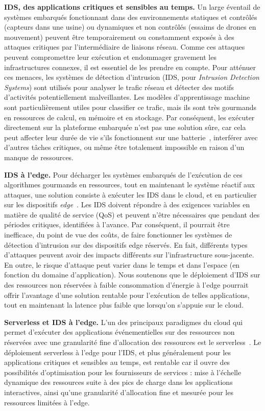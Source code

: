 \textbf{IDS, des applications critiques et sensibles au temps.} Un large éventail de systèmes embarqués fonctionnant dans des environnements statiques et contrôlés (capteurs dans une usine) ou dynamiques et non contrôlés (essaims de drones en mouvement) peuvent être temporairement ou constamment exposés à des attaques critiques par l'intermédiaire de liaisons réseau. Comme ces attaques peuvent compromettre leur exécution et endommager gravement les infrastructures connexes, il est essentiel de les prendre en compte. Pour atténuer ces menaces, les systèmes de détection d'intrusion (IDS, pour \textit{Intrusion Detection Systems}) sont utilisés pour analyser le trafic réseau et détecter des motifs d'activités potentiellement malveillantes. Les modèles d'apprentissage machine sont particulièrement utiles pour classifier ce trafic, mais ils sont très gourmands en ressources de calcul, en mémoire et en stockage. Par conséquent, les exécuter directement sur la plateforme embarquée n'est pas une solution sûre, car cela peut affecter leur durée de vie s'ils fonctionnent sur une batterie~\cite{slimani:hal-04159551}, interférer avec d'autres tâches critiques, ou même être totalement impossible en raison d'un manque de ressources.

\textbf{IDS à l'edge.} Pour décharger les systèmes embarqués de l'exécution de ces algorithmes gourmands en ressources, tout en maintenant le système réactif aux attaques, une solution consiste à exécuter les IDS dans le cloud, et en particulier sur les dispositifs \textit{edge}~\cite{eskandari2020}. Les IDS doivent répondre à des exigences variables en matière de qualité de service (QoS) et peuvent n'être nécessaires que pendant des périodes critiques, identifiées à l'avance. Par conséquent, il pourrait être inefficace, du point de vue des coûts, de faire fonctionner les systèmes de détection d'intrusion sur des dispositifs edge réservés. En fait, différents types d'attaques peuvent avoir des impacts différents sur l'infrastructure sous-jacente. En outre, le risque d'attaque peut varier dans le temps et dans l'espace (en fonction du domaine d'application). Nous soutenons que le déploiement d'IDS sur des ressources non réservées à faible consommation d'énergie à l'edge pourrait offrir l'avantage d'une solution rentable pour l'exécution de telles applications, tout en maintenant la latence plus faible que lorsqu'on s'appuie sur le cloud.

\textbf{Serverless et IDS à l'edge.} L'un des principaux paradigmes du cloud qui permet d'exécuter des applications événementielles sur des ressources non réservées avec une granularité fine d'allocation des ressources est le serverless~\cite{Lannurien2023}. Le déploiement serverless à l'edge pour l'IDS, et plus généralement pour les applications critiques et sensibles au temps, est rentable car il ouvre des possibilités d'optimisation pour les fournisseurs de services : mise à l'échelle dynamique des ressources suite à des pics de charge dans les applications interactives, ainsi qu'une granularité d'allocation fine et mesurée pour les ressources limitées à l'edge.

